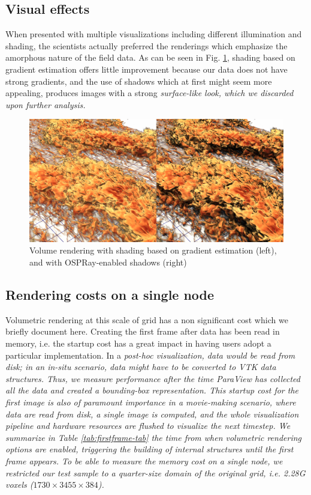 \documentclass[final,5p,times,twocolumn]{elsarticle}
\begin{document}
\subsection{Visual effects}

When presented with multiple visualizations including different illumination and
shading, the scientists actually preferred the renderings which emphasize the
amorphous nature of the field data. As can be seen in Fig. \ref{fig:shadings},
shading based on gradient estimation offers little improvement because our data
does not have strong gradients, and the use of shadows which at first might seem
more appealing, produces images with a strong \it{surface-like} \rm look, which
we discarded upon further analysis.

\begin{figure}
	\centering
	\includegraphics[width=\linewidth]{fig2montage}%
	\caption{\label{fig:shadings} Volume rendering with shading based on gradient
estimation (left), and with OSPRay-enabled shadows (right)}
\end{figure}


\subsection{Rendering costs on a single node}

Volumetric rendering at this scale of grid has a non significant cost which we
briefly document here. Creating the first frame after data has been read in memory,
 i.e. the startup cost has a great impact in having users adopt a particular implementation.
In a \it{post-hoc} \rm visualization, data would be read from disk; in an \it{in-situ} \rm
scenario, data might have to be converted to VTK data structures. Thus, we measure performance
after the time ParaView has collected all the data and created a bounding-box representation. This startup cost for the first image is also of paramount importance in a movie-making scenario, where data are read from disk, a single image is computed, and the whole visualization pipeline and hardware resources are flushed to visualize the next timestep.
\newline
We summarize in Table \ref{tab:firstframe-tab} the time from when volumetric rendering options are enabled, triggering the building of internal structures until the first frame appears.
To be able to measure the memory cost on a single node, we restricted our test sample to a quarter-size domain of the original grid, i.e. 2.28G voxels ($ 1730 \times 3455 \times 384 $).
\end{document}
